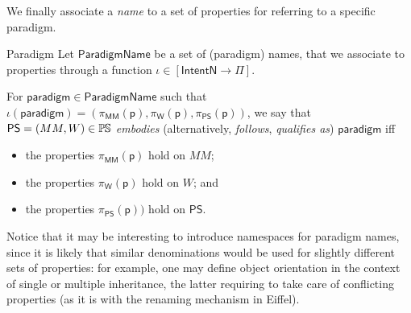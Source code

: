 We finally associate a \emph{name} to a set of properties for referring to a 
specific paradigm.
\begin{Definition}{\label{def:Paradigm}Paradigm}
Let $\mathsf{ParadigmName}$ be a set of (paradigm) names, that we associate to 
properties through a function $\iota \in [\mathsf{IntentN} \to \Pi]$.

For $\mathsf{paradigm}\in\mathsf{ParadigmName}$ such that 
$\iota(\mathsf{paradigm}) = (\pi_{\mathsf{MM}}(\mathsf{p}),                     
 \pi_{\mathsf{W}}(\mathsf{p}),                      
\pi_{\mathsf{PS}}(\mathsf{p}))$, 
we say that $\mathsf{PS} = (MM, W)\in\mathbb{P}\mskip-1mu\mathbb{S}$ \emph{embodies} (alternatively, 
\emph{follows}, \emph{qualifies as}) $\mathsf{paradigm}$ iff
\begin{itemize}
   \item the properties $\pi_{\mathsf{MM}}(\mathsf{p})$ hold on $MM$;
   \item the properties $\pi_{\mathsf{W}}(\mathsf{p})$ hold on $W$; and
   \item the properties $ \pi_{\mathsf{PS}}(\mathsf{p}))$ hold on $\mathsf{PS}$.
\end{itemize}
\end{Definition}
Notice that it may be interesting to introduce namespaces for paradigm names, 
since it is likely that similar denominations would be used for slightly 
different sets of properties: for example, one may define object orientation in 
the context of single or multiple inheritance, the latter requiring to take 
care of conflicting properties (as it is with the renaming mechanism in Eiffel).

